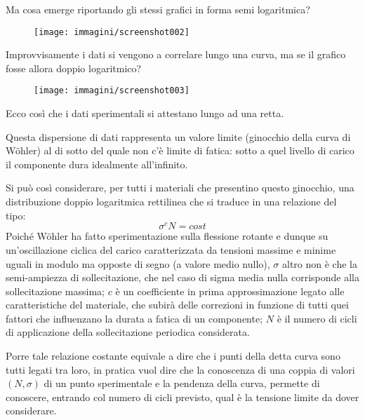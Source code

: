 \documentclass{article}
\begin{document}
\begin{adjustwidth}{2in}{}
		Ma cosa emerge riportando gli stessi grafici in forma semi logaritmica? 
		
		\begin{figure}[H]
			\centering
			\texttt{[image: immagini/screenshot002]}
			\label{fig:screenshot002}
		\end{figure}		
		
		Improvvisamente i dati si vengono a correlare lungo una curva, ma se il grafico fosse allora doppio logaritmico?
		
		\begin{figure}[H]
			\centering
			\texttt{[image: immagini/screenshot003]}
			\label{fig:screenshot003}
		\end{figure}		 
		
		Ecco così che i dati sperimentali si attestano lungo ad una retta. 
		
		Questa dispersione di dati rappresenta un valore limite (ginocchio della curva di Wöhler) al di sotto del quale non c'è limite di fatica: sotto a quel livello di carico il componente dura idealmente all'infinito. \newline
		
		Si può così considerare, per tutti i materiali che presentino questo ginocchio, una distribuzione doppio logaritmica  rettilinea che si traduce in una relazione del tipo:
		\[\sigma^cN=cost\]
		Poiché Wöhler ha fatto sperimentazione sulla flessione rotante e dunque su un'oscillazione ciclica del carico caratterizzata da tensioni massime e minime uguali in modulo ma opposte di segno (a valore medio nullo), $\sigma$ altro non è che la semi-ampiezza di sollecitazione, che nel caso di sigma media nulla corrisponde alla sollecitazione massima; $ c $ è un coefficiente in prima approssimazione legato alle caratteristiche del materiale, che subirà delle correzioni in funzione di tutti quei fattori che influenzano la durata a fatica di un componente; $ N $ è il numero di cicli di applicazione della sollecitazione periodica considerata. \newline 
		
		Porre tale relazione costante equivale a dire che i punti della detta curva sono tutti legati tra loro, in pratica vuol dire che la conoscenza di una coppia di valori $(N, \sigma)$ di un punto sperimentale e la pendenza della curva, permette di conoscere, entrando col numero di cicli previsto, qual è la tensione limite da dover considerare. \newline
		

\end{adjustwidth}
\end{document}
